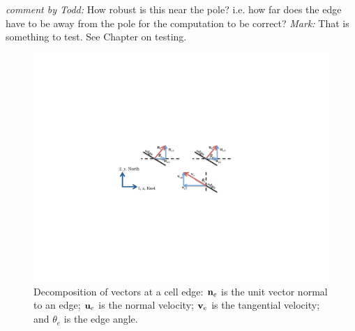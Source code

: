 \documentclass[11pt]{report}
\begin{document}
{\it comment by Todd:} How robust is this near the pole?  i.e. how far does the edge have to be away from the pole for the computation to be correct? {\it Mark:} That is something to test.  See Chapter on testing.

\begin{figure}[htbp]
 \center
 \includegraphics[trim=3.2in 3.2in 3.0in 3.2in, clip=true, scale=1.0]{f/u_v_coord_e.pdf}
 \caption{Decomposition of vectors at a cell edge: ${\bf n}_e$ is the unit vector normal to an edge; ${\bf u}_e$ is the normal velocity; ${\bf v}_e$ is the tangential velocity; and $\theta_e$ is the edge angle.}
 \label{fig:edge vectors}
\end{figure}
\end{document}
